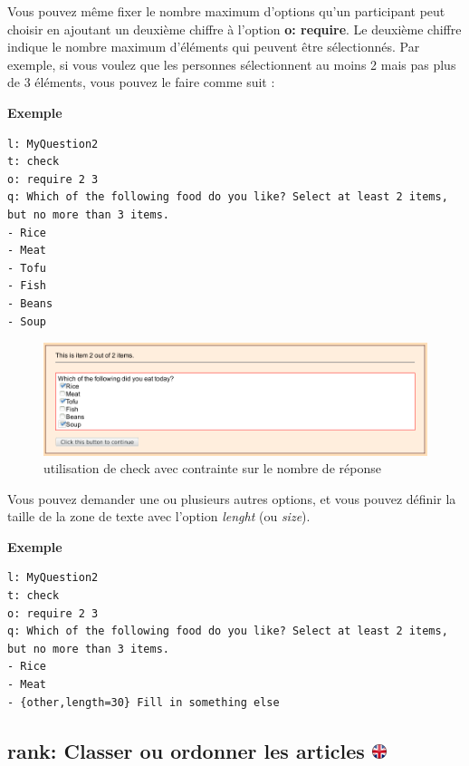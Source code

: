 \documentclass[
]{book}
\begin{document}
Vous pouvez même fixer le nombre maximum d'options qu'un participant peut choisir en ajoutant un deuxième chiffre à l'option \textbf{o: require}. Le deuxième chiffre indique le nombre maximum d'éléments qui peuvent être sélectionnés. Par exemple, si vous voulez que les personnes sélectionnent au moins 2 mais pas plus de 3 éléments, vous pouvez le faire comme suit :

\textbf{Exemple}

\begin{verbatim}
l: MyQuestion2
t: check
o: require 2 3
q: Which of the following food do you like? Select at least 2 items, but no more than 3 items.
- Rice
- Meat
- Tofu
- Fish
- Beans
- Soup
\end{verbatim}

\begin{figure}
\centering
\includegraphics{img/check.png}
\caption{utilisation de check avec contrainte sur le nombre de réponse}
\end{figure}

Vous pouvez demander une ou plusieurs autres options, et vous pouvez définir la taille de la zone de texte avec l'option \emph{lenght} (ou \emph{size}).

\textbf{Exemple}

\begin{verbatim}
l: MyQuestion2
t: check
o: require 2 3
q: Which of the following food do you like? Select at least 2 items, but no more than 3 items.
- Rice
- Meat
- {other,length=30} Fill in something else
\end{verbatim}

\hypertarget{rank-classer-ou-ordonner-les-articles}{%
\subsection[rank: Classer ou ordonner les articles ]{\texorpdfstring{rank: Classer ou ordonner les articles \href{https://www.psytoolkit.org/doc3.4.0/online-survey-syntax.html\#rank}{\protect\includegraphics{img/ukflag.png}}}{rank: Classer ou ordonner les articles }}\label{rank-classer-ou-ordonner-les-articles}}
\end{document}
